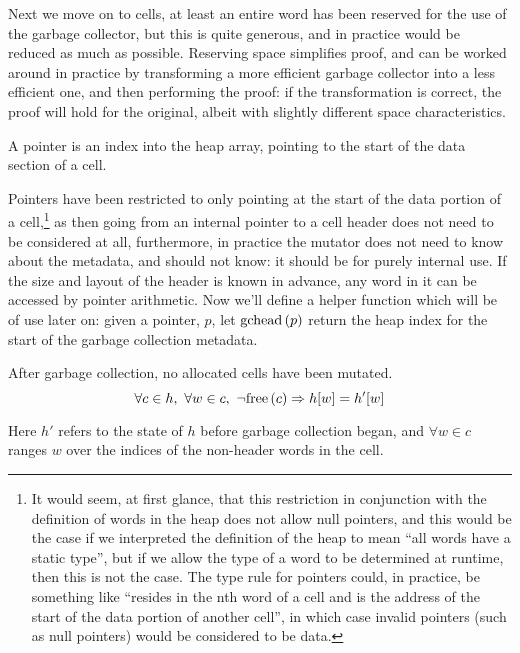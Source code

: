 Next we move on to cells, at least an entire word has been reserved
for the use of the garbage collector, but this is quite generous, and
in practice would be reduced as much as possible. Reserving space
simplifies proof, and can be worked around in practice by transforming
a more efficient garbage collector into a less efficient one, and then
performing the proof: if the transformation is correct, the proof will
hold for the original, albeit with slightly different space
characteristics.

\begin{definition}[Pointer]
  \label{def:ms-pointer}
  A pointer is an index into the heap array, pointing to the start of
  the data section of a cell.
\end{definition}

Pointers have been restricted to only pointing at the start of the
data portion of a cell,\footnote{It would seem, at first glance, that
  this restriction in conjunction with the definition of words in the
  heap does not allow null pointers, and this would be the case if we
  interpreted the definition of the heap to mean ``all words have a
  static type'', but if we allow the type of a word to be determined
  at runtime, then this is not the case. The type rule for pointers
  could, in practice, be something like ``resides in the nth word of a
  cell and is the address of the start of the data portion of another
  cell'', in which case invalid pointers (such as null pointers) would
  be considered to be data.} as then going from an internal pointer to
a cell header does not need to be considered at all, furthermore, in
practice the mutator does not need to know about the metadata, and
should not know: it should be for purely internal use. If the size and
layout of the header is known in advance, any word in it can be
accessed by pointer arithmetic. Now we'll define a helper function
which will be of use later on: given a pointer, $p$, let $\mathrm{gchead}\left(p\right)$
return the heap index for the start of the garbage collection
metadata.


\begin{definition}
  \label{def:ms-word-preservation}
  After garbage collection, no allocated cells have been mutated.
   \[\forall c \in h,\ \forall w \in c,\ \lnot\mathrm{free}\left(c\right) \Rightarrow h[w] =
   h'[w]\]

   Here $h'$ refers to the state of $h$ before garbage collection
   began, and $\forall w \in c$ ranges $w$ over the indices of the
   non-header words in the cell.
\end{definition}

